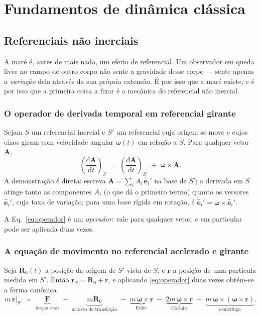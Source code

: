 \documentclass[11pt,a4paper,oneside]{report}
\theoremstyle{definition}
\theoremstyle{plain}
\theoremstyle{remark}
\newcommand{\vect}[1]{\bm{#1}}
\newcommand{\uvec}[1]{\hat{\bm{#1}}}
\newcommand{\ddt}[1]{\frac{\mathrm{d} #1}{\mathrm{d} t}}
\begin{document}
\part{Fundamentos de dinâmica clássica}
\label{parte:fundamentos}

\chapter{Referenciais não inerciais}
\label{cap:referenciais}

A maré é, antes de mais nada, um efeito de referencial. Um observador em queda
livre no campo de outro corpo não sente a gravidade desse corpo — sente apenas
a \emph{variação} dela através da sua própria extensão. É por isso que a maré
existe, e é por isso que a primeira coisa a fixar é a mecânica do referencial
não inercial.

\section{O operador de derivada temporal em referencial girante}

Sejam $S$ um referencial inercial e $S'$ um referencial cuja origem se move e
cujos eixos giram com velocidade angular $\vect{\omega}(t)$ em relação a $S$.
Para qualquer vetor $\vect{A}$,
\begin{equation}
\left(\ddt{\vect{A}}\right)_{S} \;=\; \left(\ddt{\vect{A}}\right)_{S'} \;+\;
\vect{\omega}\times\vect{A}.
\label{eq:operador}
\end{equation}
A demonstração é direta: escreva $\vect{A}=\sum_i A_i\,\uvec{e}_i'$ na base de
$S'$; a derivada em $S$ atinge tanto as componentes $A_i$ (o que dá o primeiro
termo) quanto os versores $\uvec{e}_i'$, cuja taxa de variação, para uma base
rígida em rotação, é $\dot{\uvec{e}}_i'=\vect{\omega}\times\uvec{e}_i'$.

A Eq.~\eqref{eq:operador} é um \emph{operador}: vale para qualquer vetor, e em
particular pode ser aplicada duas vezes.

\section{A equação de movimento no referencial acelerado e girante}

Seja $\vect{R}_0(t)$ a posição da origem de $S'$ vista de $S$, e $\vect{r}$ a
posição de uma partícula medida em $S'$. Então
$\vect{r}_{S}=\vect{R}_0+\vect{r}$, e aplicando \eqref{eq:operador} duas vezes
obtém-se a forma canônica
\begin{equation}
m\,\ddot{\vect{r}}\Big|_{S'} \;=\;
\underbrace{\vect{F}}_{\text{forças reais}}
\;-\;\underbrace{m\ddot{\vect{R}}_0}_{\text{arrasto de translação}}
\;-\;\underbrace{m\,\dot{\vect{\omega}}\times\vect{r}}_{\text{Euler}}
\;-\;\underbrace{2m\,\vect{\omega}\times\dot{\vect{r}}}_{\text{Coriolis}}
\;-\;\underbrace{m\,\vect{\omega}\times(\vect{\omega}\times\vect{r})}_{\text{centrífuga}}.
\label{eq:naoinercial}
\end{equation}
\end{document}
